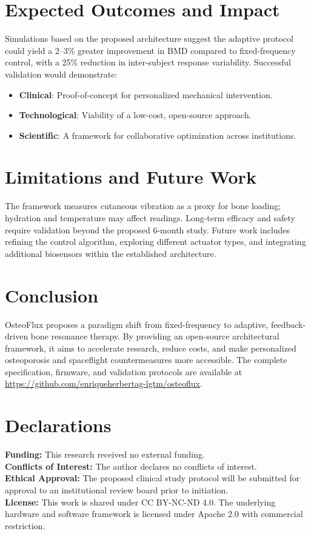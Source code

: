\documentclass[twocolumn]{article}
\begin{document}
\section{Expected Outcomes and Impact}
Simulations based on the proposed architecture suggest the adaptive protocol could yield a 2–3\% greater improvement in BMD compared to fixed-frequency control, with a 25\% reduction in inter-subject response variability. Successful validation would demonstrate:
\begin{itemize}
    \item \textbf{Clinical}: Proof-of-concept for personalized mechanical intervention.
    \item \textbf{Technological}: Viability of a low-cost, open-source approach.
    \item \textbf{Scientific}: A framework for collaborative optimization across institutions.
\end{itemize}

\section{Limitations and Future Work}
The framework measures cutaneous vibration as a proxy for bone loading; hydration and temperature may affect readings. Long-term efficacy and safety require validation beyond the proposed 6-month study. Future work includes refining the control algorithm, exploring different actuator types, and integrating additional biosensors within the established architecture.

\section{Conclusion}
OsteoFlux proposes a paradigm shift from fixed-frequency to adaptive, feedback-driven bone resonance therapy. By providing an open-source architectural framework, it aims to accelerate research, reduce costs, and make personalized osteoporosis and spaceflight countermeasures more accessible. The complete specification, firmware, and validation protocols are available at \url{https://github.com/enriqueherbertag-lgtm/osteoflux}.

\section*{Declarations}
\textbf{Funding:} This research received no external funding. \\
\textbf{Conflicts of Interest:} The author declares no conflicts of interest. \\
\textbf{Ethical Approval:} The proposed clinical study protocol will be submitted for approval to an institutional review board prior to initiation. \\
\textbf{License:} This work is shared under CC BY-NC-ND 4.0. The underlying hardware and software framework is licensed under Apache 2.0 with commercial restriction.



\end{document}
